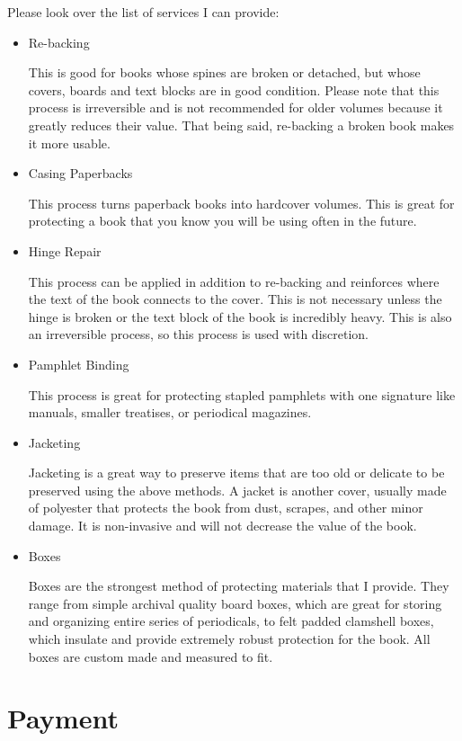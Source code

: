 \documentclass{article}
\begin{document}
Please look over the list of services I can provide:
\begin{itemize}
\item Re-backing

This is good for books whose spines are broken or detached, but
whose covers, boards and text blocks are in good condition. Please note
that this process is irreversible and is not recommended for older volumes
because it greatly reduces their value. That being said, re-backing a broken book makes it more usable.

\item Casing Paperbacks

This process turns paperback books into hardcover volumes. This is great for protecting
a book that you know you will be using often in the future.

\item Hinge Repair

This process can be applied in addition to re-backing and reinforces where the text of the book
connects to the cover. This is not necessary unless the hinge is broken or the text block
of the book is incredibly heavy. This is also an irreversible process, so this process 
is used with discretion.

\item Pamphlet Binding

This process is great for protecting stapled pamphlets with one signature like manuals, smaller
treatises, or periodical magazines.

\item Jacketing

Jacketing is a great way to preserve items that are too old or delicate to be preserved using
the above methods. A jacket is another cover, usually made of polyester that protects the book
from dust, scrapes, and other minor damage. It is non-invasive and will not decrease the value
of the book.

\item Boxes

Boxes are the strongest method of protecting materials that I provide. They range from simple
archival quality board boxes, which are great for storing and organizing entire series of 
periodicals, to felt padded clamshell boxes, which insulate and provide extremely robust
protection for the book. All boxes are custom made and measured to fit.


\end{itemize}

\section{Payment}
\end{document}

